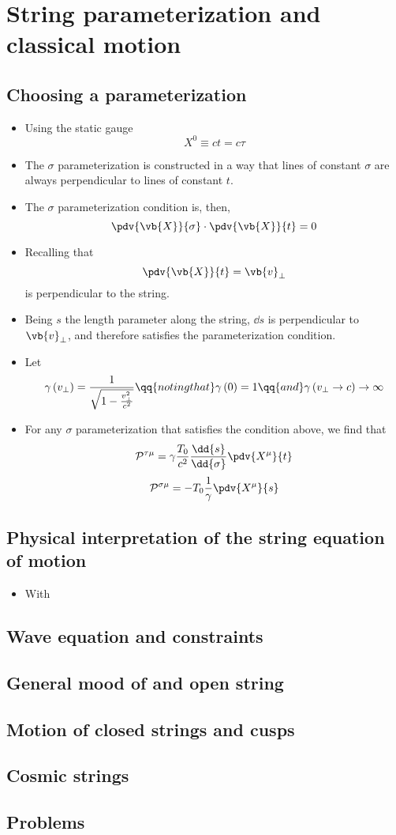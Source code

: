 \documentclass[12pt]{report}
\begin{document}
\chapter{String parameterization and classical motion}
\newpage
\section{Choosing a parameterization}
\begin{itemize}
    \item Using the static gauge $$X^0 \equiv ct = c\tau$$
    \item The $\sigma$ parameterization is constructed in a way that lines of constant $\sigma$ are always perpendicular to lines of constant $t$.
    \item The $\sigma$ parameterization condition is, then,
    $$\pdv{\vb{X}}{\sigma} \cdot \pdv{\vb{X}}{t} =0$$
    \item Recalling that
    $$\pdv{\vb{X}}{t} = \vb{v}_{\perp}$$
    is perpendicular to the string.
    \item Being $s$ the length parameter along the string, $\dd{s}$ is perpendicular to $\vb{v}_{\perp}$, and therefore satisfies the parameterization condition.
    \item Let
    $$\gamma \left(v_{\perp} \right) = \frac{1}{\sqrt{1 - \frac{v^2_{\perp}}{c^2}}}\qq{noting that}\gamma \left(0 \right) = 1\qq{and}\gamma \left(v_{\perp} \to c \right) \to \infty$$
    \item For any $\sigma$ parameterization that satisfies the condition above, we find that
    $$\mathcal{P}^{\tau \mu} = \gamma\frac{T_0}{c^2} \frac{\dd{s}}{\dd{\sigma}}\pdv{X^{\mu}}{t}$$
    $$\mathcal{P}^{\sigma \mu} = -T_0\frac{1}{\gamma} \pdv{X^{\mu}}{s}$$
\end{itemize}

\section{Physical interpretation of the string equation of motion}
\begin{itemize}
    \item With 
\end{itemize}

\section{Wave equation and constraints}

\section{General mood of and open string}

\section{Motion of closed strings and cusps}

\section{Cosmic strings}

\section{Problems}
\end{document}
